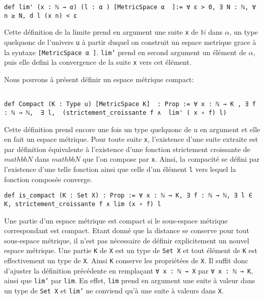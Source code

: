 \documentclass[a4paper, 12pt]{article}
\newcommand{\lean}[1]{\texttt{#1}}
\begin{document}
\begin{verbatim}
def lim' (x : ℕ → α) (l : α ) [MetricSpace α  ]:= ∀ ε > 0, ∃ N : ℕ, ∀ n ≥ N, d l (x n) < ε
\end{verbatim}

Cette définition de la limite prend en argument une suite \lean{x} de $\mathbb{N}$ dans $\alpha$, un type quelquonc de l'univers \lean{u} à partir duquel on construit un espace metrique grace à la syntaxe \lean{[MetricSpace α  ]}. \lean{lim'} prend en second argument un élément de $\alpha$, puis elle defini la convergence de la suite \lean{x} vers cet élément.

Nous pouvons à présent définir un espace métrique compact:

\begin{verbatim}

def Compact (K : Type u) [MetricSpace K]  : Prop := ∀ x : ℕ → K , ∃ f : ℕ → ℕ,  ∃ l,  (strictement_croissante f ∧  lim' ( x ∘ f) l)
\end{verbatim}

Cette définition prend encore une fois un type quelquonc  de u en argument et elle en fait un espace métrique. Pour toute suite \lean{x}, l'existence d'une suite extraite est par définition équivalente à l'existence d'une fonction strictement croissante de $mathbb{N} $ dans $mathbb{N} $  que l'on compose par \lean{x}. Ainsi, la compacité se défini  par l'existence d'une telle fonction ainsi que celle d'un élément \lean{l} vers lequel la fonction composée converge.

\begin{verbatim}
def is_compact (K : Set X) : Prop := ∀ x : ℕ → K, ∃ f : ℕ → ℕ, ∃ l ∈ K, strictement_croissante f ∧ lim (x ∘ f) l

\end{verbatim}

Une partie d'un espace métrique est compact si le sous-espace métrique correspondant est compact. Etant donné que la distance se conserve pour tout sous-espace métrique, il n'est pas nécessaire de définir explicitement un nouvel espace métrique. Une partie \lean{K} de \lean{X} est un type de \lean{Set X} et tout élément de  \lean{K} est effectivement un type de \lean{X}. Ainsi  \lean{K} conserve les propriétées de \lean{X}. Il suffit donc d'ajuster la définition précédente en remplaçant \lean{∀ x : ℕ → X} par \lean{∀ x : ℕ → K}, ainsi que \lean{lim'} par \lean{lim}. En effet, \lean{lim} prend en argument une suite à valeur dans un type de \lean{Set X} et \lean{lim'} ne conviend qu'à une suite à valeurs dans \lean{X}.
\end{document}
